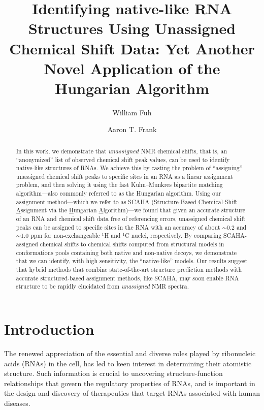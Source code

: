 \documentclass[journal=jcisd8,manuscript=article,layout=onecolumn]{achemso}
\author{William Fuh}
\author{Aaron T. Frank}
\affiliation{Departments of Biophysics and Chemistry, University of Michigan, 930 North University Avenue, Ann Arbor, Michigan 48109, USA}
\title[Title]
 {Identifying native-like RNA Structures Using Unassigned Chemical Shift Data: Yet Another Novel Application of the Hungarian Algorithm}
\begin{document}
\begin{abstract}
In this work, we demonstrate that $\textit{unassigned}$ NMR chemical shifts, that is, an  ``anonymized'' list of observed chemical shift peak values, can be used to identify native-like structures of RNAs.  We achieve this by casting the problem of ``assigning''  unassigned chemical shift peaks to specific sites in an RNA as a linear assignment problem, and then solving it using the fast Kuhn--Munkres  bipartite matching algorithm---also commonly referred to as the Hungarian algorithm. Using our assignment method---which we refer to as SCAHA (\underline{S}tructure-Based \underline{C}hemical-Shift \underline{A}ssignment via the \underline{H}ungarian \underline{A}lgorithm)---we found that given an accurate structure of an RNA and chemical shift data free of referencing errors, unassigned chemical shift peaks can be assigned to specific sites in the RNA with an accuracy of about $\sim$0.2 and $\sim$1.0 ppm for non-exchangeable $^{1}$H and  $^{1}$C nuclei, respectively.  By comparing SCAHA-assigned chemical shifts to chemical shifts computed from structural models in conformations pools containing both native and non-native decoys, we demonstrate that we can identify, with high sensitivity, the “native-like” models. Our results suggest that hybrid methods that combine state-of-the-art structure prediction methods with accurate structured-based assignment methods, like SCAHA,  may soon enable RNA structure to be rapidly elucidated from \textit{unassigned} NMR spectra.
\end{abstract}
 
\section{Introduction}
The renewed appreciation of the essential and diverse roles played by ribonucleic acids (RNAs) in the cell\cite{encode2012integrated}, has led to keen interest in determining their atomistic structure. Such information is crucial to uncovering structure-function relationships that govern the regulatory properties of RNAs, and is important in the design and discovery of therapeutics that target RNAs associated with human diseases\cite{cooper2009rna}. 
\end{document}
